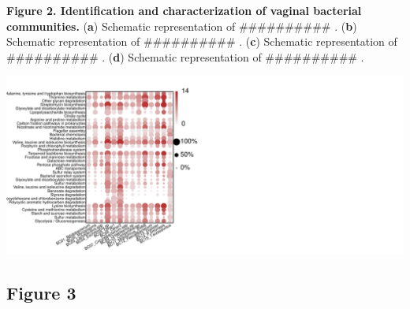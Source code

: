 \documentclass[
]{article}
\begin{document}
\textbf{Figure 2. Identification and characterization of vaginal bacterial communities.}
(\textbf{a}) Schematic representation of \#\#\#\#\#\#\#\#\#\# .
(\textbf{b}) Schematic representation of \#\#\#\#\#\#\#\#\#\# .
(\textbf{c}) Schematic representation of \#\#\#\#\#\#\#\#\#\# .
(\textbf{d}) Schematic representation of \#\#\#\#\#\#\#\#\#\# .

\includegraphics[width=1\linewidth]{manuscript_template_files/figure-latex/unnamed-chunk-7-1}

\clearpage

\hypertarget{figure-3}{%
\subsection{Figure 3}\label{figure-3}}
\end{document}
